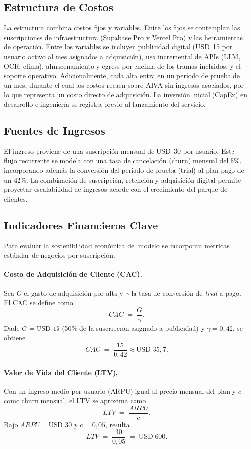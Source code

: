 \subsection{Estructura de Costos}
La estructura combina costos fijos y variables. Entre los fijos se contemplan las suscripciones de infraestructura (Supabase Pro y Vercel Pro) y las herramientas de operación. Entre los variables se incluyen publicidad digital (USD~15 por usuario activo al mes asignados a adquisición), uso incremental de APIs (LLM, OCR, clima), almacenamiento y egress por encima de los tramos incluidos, y el soporte operativo. Adicionalmente, cada alta entra en un período de prueba de un mes, durante el cual los costos recaen sobre AIVA sin ingresos asociados, por lo que representa un costo directo de adquisición. La inversión inicial (CapEx) en desarrollo e ingeniería se registra previo al lanzamiento del servicio.

\subsection{Fuentes de Ingresos}
El ingreso proviene de una suscripción mensual de USD~30 por usuario. Este flujo recurrente se modela con una tasa de cancelación (churn) mensual del 5\%, incorporando además la conversión del período de prueba (trial) al plan pago de un 42\%. La combinación de suscripción, retención y adquisición digital permite proyectar escalabilidad de ingresos acorde con el crecimiento del parque de clientes.

\subsection{Indicadores Financieros Clave}
Para evaluar la sostenibilidad económica del modelo se incorporan métricas estándar de negocios por suscripción.

\paragraph{Costo de Adquisición de Cliente (CAC).}
Sea $G$ el gasto de adquisición por alta y $\gamma$ la tasa de conversión de \emph{trial} a pago. El CAC se define como
\[
CAC \;=\; \frac{G}{\gamma}.
\]
Dado $G = \text{USD }15$ (50\% de la suscripción asignado a publicidad) y $\gamma = 0{,}42$, se obtiene
\[
CAC \;=\; \frac{15}{0{,}42} \approx \text{USD }35{,}7.
\]

\paragraph{Valor de Vida del Cliente (LTV).}
Con un ingreso medio por usuario (ARPU) igual al precio mensual del plan y $c$ como churn mensual, el LTV se aproxima como
\[
LTV \;=\; \frac{ARPU}{c}.
\]
Bajo $ARPU = \text{USD }30$ y $c = 0{,}05$, resulta
\[
LTV \;=\; \frac{30}{0{,}05} \;=\; \text{USD }600.
\]

